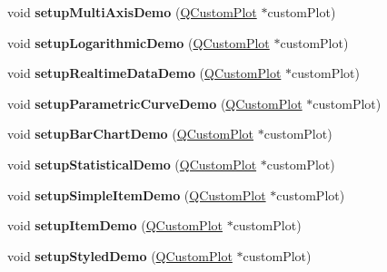 \begin{DoxyCompactItemize}
\item 
\mbox{\label{classruntime_window_a75c5dcc305fa595fd44ceb159d78b337}} 
void {\bfseries setup\+Multi\+Axis\+Demo} (\hyperlink{class_q_custom_plot}{Q\+Custom\+Plot} $\ast$custom\+Plot)
\item 
\mbox{\label{classruntime_window_a30f7cec04972e7095aa89d4d121bbb6e}} 
void {\bfseries setup\+Logarithmic\+Demo} (\hyperlink{class_q_custom_plot}{Q\+Custom\+Plot} $\ast$custom\+Plot)
\item 
\mbox{\label{classruntime_window_af310d78ce1b0c2150b22901411208cdc}} 
void {\bfseries setup\+Realtime\+Data\+Demo} (\hyperlink{class_q_custom_plot}{Q\+Custom\+Plot} $\ast$custom\+Plot)
\item 
\mbox{\label{classruntime_window_a0520e7a53f41222e700ec9ce4d93f5f5}} 
void {\bfseries setup\+Parametric\+Curve\+Demo} (\hyperlink{class_q_custom_plot}{Q\+Custom\+Plot} $\ast$custom\+Plot)
\item 
\mbox{\label{classruntime_window_aff21c61c97855ad3777614d77acdb07c}} 
void {\bfseries setup\+Bar\+Chart\+Demo} (\hyperlink{class_q_custom_plot}{Q\+Custom\+Plot} $\ast$custom\+Plot)
\item 
\mbox{\label{classruntime_window_ac241f1da5a5bad511ad1c6636603b9a2}} 
void {\bfseries setup\+Statistical\+Demo} (\hyperlink{class_q_custom_plot}{Q\+Custom\+Plot} $\ast$custom\+Plot)
\item 
\mbox{\label{classruntime_window_a52c5d2476f7719896a713f2c335941a3}} 
void {\bfseries setup\+Simple\+Item\+Demo} (\hyperlink{class_q_custom_plot}{Q\+Custom\+Plot} $\ast$custom\+Plot)
\item 
\mbox{\label{classruntime_window_a669dbb02d3e6c802df7125d41d0bd843}} 
void {\bfseries setup\+Item\+Demo} (\hyperlink{class_q_custom_plot}{Q\+Custom\+Plot} $\ast$custom\+Plot)
\item 
\mbox{\label{classruntime_window_a6172b6f0f0716b18ecdeef2e50396d22}} 
void {\bfseries setup\+Styled\+Demo} (\hyperlink{class_q_custom_plot}{Q\+Custom\+Plot} $\ast$custom\+Plot)

\end{DoxyCompactItemize}
